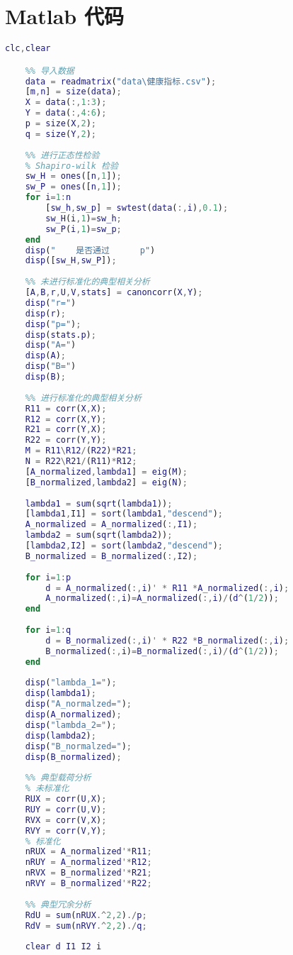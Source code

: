 \documentclass[withoutpreface]{cumcmthesis}
\begin{document}
\section{Matlab 代码}
\begin{lstlisting}[language=matlab]
    clc,clear

    %% 导入数据
    data = readmatrix("data\健康指标.csv");
    [m,n] = size(data);
    X = data(:,1:3);
    Y = data(:,4:6);
    p = size(X,2);
    q = size(Y,2);
    
    %% 进行正态性检验
    % Shapiro-wilk 检验
    sw_H = ones([n,1]);
    sw_P = ones([n,1]);
    for i=1:n
        [sw_h,sw_p] = swtest(data(:,i),0.1);
        sw_H(i,1)=sw_h;
        sw_P(i,1)=sw_p;
    end
    disp("    是否通过      p")
    disp([sw_H,sw_P]);
    
    %% 未进行标准化的典型相关分析
    [A,B,r,U,V,stats] = canoncorr(X,Y);
    disp("r=")
    disp(r);
    disp("p=");
    disp(stats.p);
    disp("A=")
    disp(A);
    disp("B=")
    disp(B);
    
    %% 进行标准化的典型相关分析
    R11 = corr(X,X);
    R12 = corr(X,Y);
    R21 = corr(Y,X);
    R22 = corr(Y,Y);
    M = R11\R12/(R22)*R21;
    N = R22\R21/(R11)*R12;
    [A_normalized,lambda1] = eig(M);
    [B_normalized,lambda2] = eig(N);
    
    lambda1 = sum(sqrt(lambda1));
    [lambda1,I1] = sort(lambda1,"descend");
    A_normalized = A_normalized(:,I1);
    lambda2 = sum(sqrt(lambda2));
    [lambda2,I2] = sort(lambda2,"descend");
    B_normalized = B_normalized(:,I2);
    
    for i=1:p
        d = A_normalized(:,i)' * R11 *A_normalized(:,i);
        A_normalized(:,i)=A_normalized(:,i)/(d^(1/2));
    end
    
    for i=1:q
        d = B_normalized(:,i)' * R22 *B_normalized(:,i);
        B_normalized(:,i)=B_normalized(:,i)/(d^(1/2));
    end
    
    disp("lambda_1=");
    disp(lambda1);
    disp("A_normalzed=");
    disp(A_normalized);
    disp("lambda_2=");
    disp(lambda2);
    disp("B_normalzed=");
    disp(B_normalized);
    
    %% 典型载荷分析
    % 未标准化
    RUX = corr(U,X);
    RUY = corr(U,V);
    RVX = corr(V,X);
    RVY = corr(V,Y);
    % 标准化
    nRUX = A_normalized'*R11;
    nRUY = A_normalized'*R12;
    nRVX = B_normalized'*R21;
    nRVY = B_normalized'*R22;
    
    %% 典型冗余分析
    RdU = sum(nRUX.^2,2)./p;
    RdV = sum(nRVY.^2,2)./q;
    
    clear d I1 I2 i     
\end{lstlisting}
\end{document}
